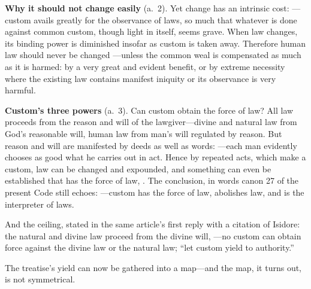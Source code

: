 \textbf{Why it should not change easily} (a.~2). Yet change has an intrinsic cost: ---custom avails greatly for the observance of laws, so much that whatever is done against common custom, though light in itself, seems grave. When law changes, its binding power is diminished insofar as custom is taken away. Therefore human law should never be changed ---unless the common weal is compensated as much as it is harmed: by a very great and evident benefit, or by extreme necessity where the existing law contains manifest iniquity or its observance is very harmful.

\textbf{Custom's three powers} (a.~3). Can custom obtain the force of law? All law proceeds from the reason and will of the lawgiver---divine and natural law from God's reasonable will, human law from man's will regulated by reason. But reason and will are manifested by deeds as well as words: ---each man evidently chooses as good what he carries out in act. Hence by repeated acts, which make a custom, law can be changed and expounded, and something can even be established that has the force of law, . The conclusion, in words canon 27 of the present Code still echoes: ---custom has the force of law, abolishes law, and is the interpreter of laws.

And the ceiling, stated in the same article's first reply with a citation of Isidore: the natural and divine law proceed from the divine will, ---no custom can obtain force against the divine law or the natural law; ``let custom yield to authority.''

The treatise's yield can now be gathered into a map---and the map, it turns out, is not symmetrical.
